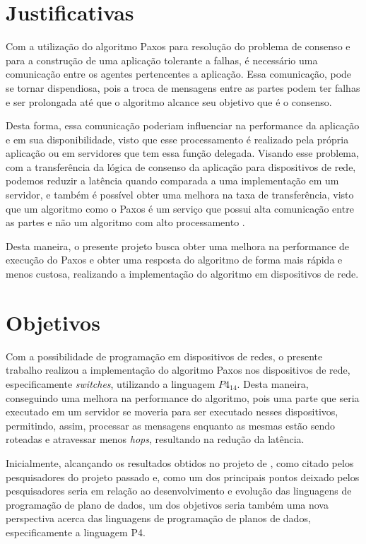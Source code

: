 \documentclass[
    12pt,
    openright, 
    oneside,
    a4paper,
    french,
    english,
    brazil
    ]{facom-ufu-abntex2}
\theoremstyle{definition}
\begin{document}
\section{Justificativas}
Com a utilização do algoritmo Paxos para resolução do problema de consenso e para a 
construção de uma aplicação tolerante a falhas, é necessário uma comunicação entre os 
agentes pertencentes a aplicação. Essa comunicação, pode se tornar dispendiosa, pois 
a troca de mensagens entre as partes podem ter falhas e ser prolongada até que o 
algoritmo alcance seu objetivo que é o consenso.

Desta forma, essa comunicação poderiam influenciar na performance da aplicação e em 
sua disponibilidade, visto que esse processamento é realizado pela própria aplicação ou 
em servidores que tem essa função delegada. Visando esse problema, com a transferência
da lógica de consenso da aplicação para dispositivos de rede, podemos reduzir a latência
quando comparada a uma implementação em um servidor, e também é possível obter uma melhora
na taxa de transferência, visto que um algoritmo como o Paxos é um serviço que possui
alta comunicação entre as partes e não um algoritmo com alto processamento
\cite{netchainRtt}.

Desta maneira, o presente projeto busca obter uma melhora na performance de 
execução do Paxos e obter uma resposta do algoritmo de forma mais rápida e menos 
custosa, realizando a implementação do algoritmo em dispositivos de rede.

\section{Objetivos}
Com a possibilidade de programação em dispositivos de redes, o presente trabalho 
realizou a implementação do algoritmo Paxos nos dispositivos de rede, especificamente
\textit{switches}, utilizando a linguagem $P4_{14}$. 
Desta maneira, conseguindo uma melhora na performance do algoritmo, pois uma parte 
que seria executado em um servidor se moveria para ser executado nesses dispositivos, permitindo,
assim, processar as mensagens enquanto as mesmas estão sendo roteadas e atravessar menos
\textit{hops}, resultando na redução da latência.

Inicialmente, alcançando os resultados obtidos no projeto de \cite{dang2016paxos}, 
como citado pelos pesquisadores do projeto passado e, como um dos principais pontos deixado pelos 
pesquisadores seria em relação ao desenvolvimento
e evolução das linguagens de programação de plano de dados, um dos objetivos seria 
também uma nova perspectiva acerca das linguagens de programação de planos de dados, 
especificamente a linguagem P4.
\end{document}
